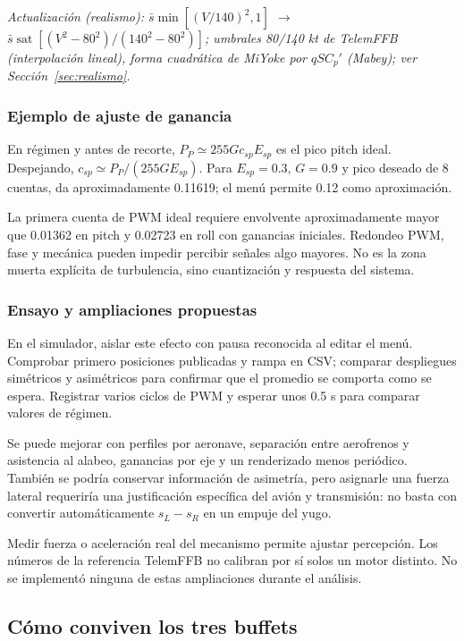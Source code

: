 \documentclass[11pt,a4paper]{article}
\newcommand{\sat}{\operatorname{sat}}
\begin{document}
\textit{Actualización (realismo): $\bar s\min[(V/140)^2,1]$ $\rightarrow$ $\bar s\sat[(V^2-80^2)/(140^2-80^2)]$; umbrales 80/140 kt de TelemFFB (interpolación lineal), forma cuadrática de MiYoke por $qSC_p'$ (Mabey); ver Sección~\ref{sec:realismo}.}

\subsubsection{Ejemplo de ajuste de ganancia}
En régimen y antes de recorte, $P_P\simeq255Gc_{sp}E_{sp}$ es el pico pitch ideal. Despejando, $c_{sp}\simeq P_P/(255GE_{sp})$. Para $E_{sp}=0.3$, $G=0.9$ y pico deseado de 8 cuentas, da aproximadamente 0.11619; el menú permite 0.12 como aproximación.

La primera cuenta de PWM ideal requiere envolvente aproximadamente mayor que 0.01362 en pitch y 0.02723 en roll con ganancias iniciales. Redondeo PWM, fase y mecánica pueden impedir percibir señales algo mayores. No es la zona muerta explícita de turbulencia, sino cuantización y respuesta del sistema.

\subsubsection{Ensayo y ampliaciones propuestas}
En el simulador, aislar este efecto con pausa reconocida al editar el menú. Comprobar primero posiciones publicadas y rampa en CSV; comparar despliegues simétricos y asimétricos para confirmar que el promedio se comporta como se espera. Registrar varios ciclos de PWM y esperar unos 0.5 s para comparar valores de régimen.

Se puede mejorar con perfiles por aeronave, separación entre aerofrenos y asistencia al alabeo, ganancias por eje y un renderizado menos periódico. También se podría conservar información de asimetría, pero asignarle una fuerza lateral requeriría una justificación específica del avión y transmisión: no basta con convertir automáticamente $s_L-s_R$ en un empuje del yugo.

Medir fuerza o aceleración real del mecanismo permite ajustar percepción. Los números de la referencia TelemFFB no calibran por sí solos un motor distinto. No se implementó ninguna de estas ampliaciones durante el análisis.

\subsection{Cómo conviven los tres buffets}
\end{document}
